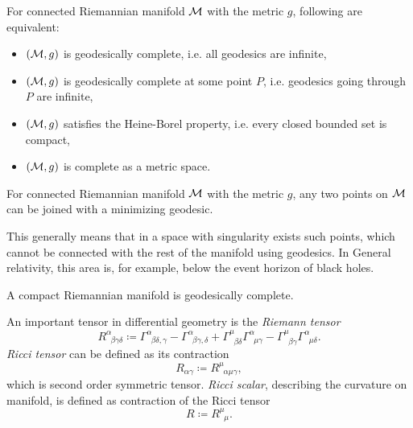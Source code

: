 \begin{thm}\citet[page 125]{petersen}
    \label{thm:hopf-Rinow}


    For connected Riemannian manifold $\mathcal{M}$ with the metric $g$, following are equivalent:
    \begin{itemize}
        \item $(\mathcal{M},g)$ is geodesically complete, i.e. all geodesics are infinite,
        \item $(\mathcal{M},g)$ is geodesically complete at some point $P$, i.e. geodesics going through $P$ are infinite,
        \item $(\mathcal{M},g)$ satisfies the Heine-Borel property, i.e. every closed bounded set is compact,
        \item $(\mathcal{M},g)$ is complete as a metric space.
    \end{itemize}
\end{thm}
\begin{thm}\citet[Chapter 3]{claudio}
    \label{thm:hopf-Rinow_modified}

    For connected Riemannian manifold $\mathcal{M}$ with the metric $g$, any two points on $\mathcal{M}$ can be joined with a minimizing geodesic.
\end{thm}
This generally means that in a space with singularity exists such points, which cannot be connected with the rest of the manifold using geodesics. In General relativity, this area is, for example, below the event horizon of black holes.

\begin{thm}\citet[Chapter 3]{claudio}
    \label{thm:compact}

    A compact Riemannian manifold is geodesically complete.
\end{thm}





An important tensor in differential geometry is the \emph{Riemann tensor}
\begin{equation}
    R^\alpha_{\;\;\beta\gamma\delta}\coloneqq \Gamma^\alpha_{\;\;\beta\delta,\gamma}-\Gamma^\alpha_{\;\;\beta\gamma,\delta}+\Gamma^\mu_{\;\;\beta\delta}\Gamma^\alpha_{\;\;\mu\gamma}-\Gamma^\mu_{\;\;\beta\gamma}\Gamma^\alpha_{\;\;\mu\delta}.
\end{equation}
\emph{Ricci tensor} can be defined as its contraction 
\begin{equation}
    R_{\alpha\gamma}\coloneqq R^\mu_{\;\;\alpha\mu\gamma},
\end{equation}
which is second order symmetric tensor.
\emph{Ricci scalar}, describing the curvature on manifold, is defined as contraction of the Ricci tensor
\begin{equation}
    R\coloneqq R^\mu_{\;\;\mu}.
\end{equation}


